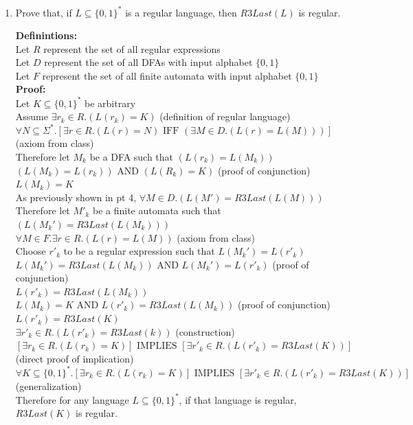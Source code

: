 \documentclass[11pt]{article}
\newcommand{\Implies}{\mbox{ IMPLIES }}
\newcommand{\And}{\mbox{ AND }}
\newcommand{\Iff}{\mbox{ IFF }}
\begin{document}
\begin{enumerate}
\item
\begin{question}
Prove that, if $L \subseteq \{0,1\}^*$ is a regular language, then $R3Last(L)$ is regular.
\end{question}

\begin{solution}
{\bf Definintions:}\\
Let $R$ represent the set of all regular expressions \\
Let $D$ represent the set of all DFAs with input alphabet $\{0,1\}$ \\
Let $F$ represent the set of all finite automata with input alphabet $\{0,1\}$ \\
{\bf Proof:}\\
\null\quad Let $K\subseteq \{0,1\}^*$ be arbitrary\\
\null\qquad Assume $\exists r_k\in R.(L(r_k) = K)$ (definition of regular language)\\
\null\qquad $\forall N\subseteq\Sigma^*.[\exists r\in R.(L(r) = N) \Iff (\exists M\in D.(L(r) = L(M)))]$ (axiom from class)\\
\null\qquad Therefore let $M_k$ be a DFA such that $(L(r_k) = L(M_k))$\\
\null\qquad $(L(M_k) = L(r_k)) \And (L(R_k) = K)$ (proof of conjunction)\\
\null\qquad $L(M_k) = K$\\
\null\qquad As previously shown in pt 4, $\forall M\in D.(L(M') = R3Last(L(M)))$\\
\null\qquad Therefore let $M'_k$ be a finite automata such that $(L(M_k') = R3Last(L(M_k)))$\\
\null\qquad $\forall M\in F.\exists r\in R.(L(r) = L(M))$ (axiom from class)\\
\null\qquad\quad Choose $r'_k$ to be a regular expression such that $L(M_k') = L(r'_k)$\\
\null\qquad\quad $L(M_k') = R3Last(L(M_k))\And L(M_k') = L(r'_k)$ (proof of conjunction)\\
\null\qquad\quad $L(r'_k) = R3Last(L(M_k))$\\
\null\qquad\quad $L(M_k) = K \And L(r'_k) = R3Last(L(M_k))$ (proof of conjunction)\\
\null\qquad\quad $L(r'_k) = R3Last(K)$\\
\null\qquad $\exists r'_k\in R.(L(r'_k) = R3Last(k))$ (construction)\\
\null\quad $[\exists r_k\in R.(L(r_k) = K)]\Implies [\exists r'_k\in R.(L(r'_k) = R3Last(K))]$ \\
\null\quad (direct proof of implication)\\
$\forall K\subseteq \{0,1\}^*.[\exists r_k\in R.(L(r_k) = K)]\Implies [\exists r'_k\in R.(L(r'_k) = R3Last(K))]$ \\
(generalization)\\
Therefore for any language $L\subseteq \{0,1\}^*$, if that language is regular, $R3Last(K)$ is regular.\\
\end{solution}

\end{enumerate}
\end{document}
